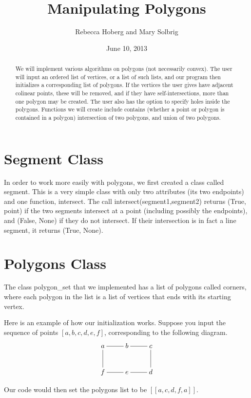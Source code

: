 \documentclass[11pt]{amsart}
\title{Manipulating Polygons}
\author{Rebecca Hoberg and Mary Solbrig}
\date{June 10, 2013}
\theoremstyle{definition}
\theoremstyle{remark}
\numberwithin{equation}{section}
\begin{document}
\begin{abstract}

We will implement various algorithms on polygons (not necessarily convex).
The user will input an ordered list of vertices, or a list of such lists, and our program then initializes a corresponding list of polygons.
If the vertices the user gives have adjacent colinear points, these will be removed, and if they have self-intersections, more than one polygon may be created. 
The user also has the option to specify holes inside the polygons.
Functions we will create include contains (whether a point or polygon is contained in a polygon) intersection of two polygons, and union of two polygons.

\end{abstract}

\maketitle

\tableofcontents

\section{Segment Class}

In order to work more easily with polygons, we first created a class called segment. This is a very simple class with only two attributes (its two endpoints) and one function, intersect.
The call intersect(segment1,segment2) returns (True, point) if the two segments intersect at a point (including possibly the endpoints), and (False, None) if they do not intersect.
If their intersection is in fact a line segment, it returns (True, None).

\section{Polygons Class}
The class polygon\_set that we implemented has a list of polygons called corners, where each polygon in the list is a list of vertices that ends with its starting vertex. 

Here is an example of how our initialization works. Suppose you input the sequence of points $[a,b,c,d,e,f]$, corresponding to the following diagram.
\[\xymatrix{
a \ar@{-}[r]  \ar@{-}[d]  & b \ar @{-}[r] & c \ar@{-}[d] \\
f \ar@{-}[r] & e\ar@{-}[r] & d\\} \]

Our code would then set the polygons list to be $[[a,c,d,f,a]]$.
\end{document}
